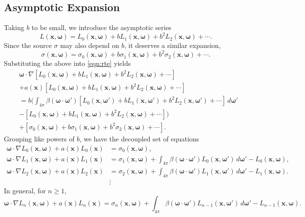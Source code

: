 \documentclass[ms,cpyr,lof,lot]{uathesis}
\renewcommand\vec\bm
\begin{document}
\subsection{Asymptotic Expansion}
Taking $b$ to be small, we introduce the asymptotic series
\newcommand{\Lasym}{L_0(\vec{x},\vec{\omega}) + b L_1(\vec{x},\vec{\omega}) + b^2 L_2(\vec{x},\vec{\omega}) + \cdots}
\newcommand{\Lasyms}{L_0(\vec{x_s},\vec{\omega}) + b L_1(\vec{x_s},\vec{\omega}) + b^2 L_2(\vec{x_s},\vec{\omega}) + \cdots}
\newcommand{\Lasymb}{L_0(\vec{x_b},\vec{\omega}) + b L_1(\vec{x_b},\vec{\omega}) + b^2 L_2(\vec{x_b},\vec{\omega}) + \cdots}
\newcommand{\Lasymp}{L_0(\vec{x},\vec{\omega}') + b L_1(\vec{x},\vec{\omega}') + b^2 L_2(\vec{x},\vec{\omega}') + \cdots}
\newcommand{\sigasym}{\sigma_0(\vec{x},\vec{\omega}) + b \sigma_1(\vec{x},\vec{\omega}) + b^2 \sigma_2(\vec{x},\vec{\omega}) + \cdots}
\begin{equation*}
  \label{eqn:Lasym}
  L(\vec{x},\vec{\omega}) = \Lasym.
\end{equation*}
Since the source $\sigma$ may also depend on $b$, it deserves a similar expansion,
\begin{equation*}
  \label{eqn:sigasym}
  \sigma(\vec{x},\vec{\omega}) = \sigasym.
\end{equation*}
Substituting the above into \eqref{eqn:rte} yields
\begin{align*}
    &\vec{\omega} \cdot \nabla \left[ \Lasym \right] \\
    &+ a(\vec{x}) \left[ \Lasym \right] \\
    &= b\Bigg(
      \int_{4\pi} \beta(\vec{\omega}\cdot\vec{\omega}')
      \left[ \Lasymp \right] \, d\vec{\omega}' \\
    &- \left[ \Lasym \right]
      \Bigg) \\
    &+ \left[ \sigasym \right].
\end{align*}
Grouping like powers of $b$, we have the decoupled set of equations
\begin{align}
  \vec{\omega} \cdot \nabla L_0(\vec{x}, \vec{\omega}) + a(\vec{x})L_0(\vec{x}) &= \sigma_0(\vec{x}, \vec{\omega}),
  \label{eqn:asymptotics_0}\\
  \vec{\omega} \cdot \nabla L_1(\vec{x}, \vec{\omega}) + a(\vec{x})L_1(\vec{x})
  &= \sigma_1(\vec{x}, \vec{\omega})
  + \int_{4\pi} \beta(\vec{\omega}\cdot\vec{\omega}') L_0(\vec{x}, \vec{\omega}')\,d\vec{\omega}' - L_0(\vec{x}, \vec{\omega}), \nonumber\\
  \vec{\omega} \cdot \nabla L_2(\vec{x}, \vec{\omega}) + a(\vec{x})L_2(\vec{x})
  &= \sigma_2(\vec{x}, \vec{\omega})
  + \int_{4\pi} \beta(\vec{\omega}\cdot\vec{\omega}') L_1(\vec{x}, \vec{\omega}')\,d\vec{\omega}' - L_1(\vec{x}, \vec{\omega}). \nonumber \\
  &\vdots \nonumber
\end{align}
In general, for $n \geq 1$,
\begin{equation}
  \vec{\omega} \cdot \nabla L_n(\vec{x}, \vec{\omega}) + a(\vec{x})L_n(\vec{x})
  = \sigma_n(\vec{x}, \vec{\omega})
  + \int_{4\pi} \beta(\vec{\omega}\cdot\vec{\omega}') L_{n-1}(\vec{x}, \vec{\omega}')\,d\vec{\omega}' - L_{n-1}(\vec{x}, \vec{\omega}).
  \label{eqn:asymptotics_n}
\end{equation}
\end{document}
